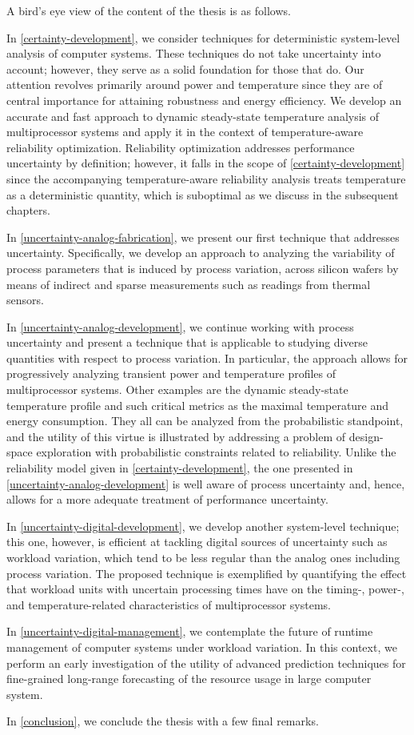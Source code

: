 A bird's eye view of the content of the thesis is as follows.

In \cref{certainty-development}, we consider techniques for deterministic
system-level analysis of computer systems. These techniques do not take
uncertainty into account; however, they serve as a solid foundation for those
that do. Our attention revolves primarily around power and temperature since
they are of central importance for attaining robustness and energy efficiency.
We develop an accurate and fast approach to dynamic steady-state temperature
analysis of multiprocessor systems and apply it in the context of
temperature-aware reliability optimization. Reliability optimization addresses
performance uncertainty by definition; however, it falls in the scope of
\cref{certainty-development} since the accompanying temperature-aware
reliability analysis treats temperature as a deterministic quantity, which is
suboptimal as we discuss in the subsequent chapters.

In \cref{uncertainty-analog-fabrication}, we present our first technique that
addresses uncertainty. Specifically, we develop an approach to analyzing the
variability of process parameters that is induced by process variation, across
silicon wafers by means of indirect and sparse measurements such as readings
from thermal sensors.

In \cref{uncertainty-analog-development}, we continue working with process
uncertainty and present a technique that is applicable to studying diverse
quantities with respect to process variation. In particular, the approach allows
for progressively analyzing transient power and temperature profiles of
multiprocessor systems. Other examples are the dynamic steady-state temperature
profile and such critical metrics as the maximal temperature and energy
consumption. They all can be analyzed from the probabilistic standpoint, and the
utility of this virtue is illustrated by addressing a problem of design-space
exploration with probabilistic constraints related to reliability. Unlike the
reliability model given in \cref{certainty-development}, the one presented in
\cref{uncertainty-analog-development} is well aware of process uncertainty and,
hence, allows for a more adequate treatment of performance uncertainty.

In \cref{uncertainty-digital-development}, we develop another system-level
technique; this one, however, is efficient at tackling digital sources of
uncertainty such as workload variation, which tend to be less regular than the
analog ones including process variation. The proposed technique is exemplified
by quantifying the effect that workload units with uncertain processing times
have on the timing-, power-, and temperature-related characteristics of
multiprocessor systems.

In \cref{uncertainty-digital-management}, we contemplate the future of runtime
management of computer systems under workload variation. In this context, we
perform an early investigation of the utility of advanced prediction techniques
for fine-grained long-range forecasting of the resource usage in large computer
system.

In \cref{conclusion}, we conclude the thesis with a few final remarks.
